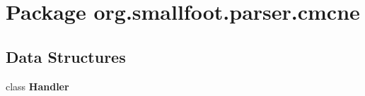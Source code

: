 \section{Package org.\+smallfoot.\+parser.\+cmcne}
\label{namespaceorg_1_1smallfoot_1_1parser_1_1cmcne}
\subsection*{Data Structures}
\begin{DoxyCompactItemize}
\item 
class {\bf Handler}
\end{DoxyCompactItemize}
